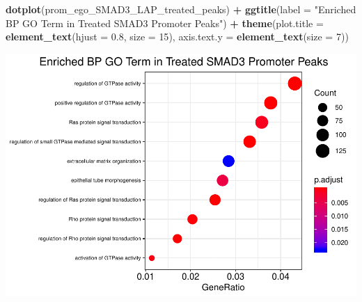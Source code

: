 \documentclass[]{article}
\newenvironment{Shaded}{\begin{snugshade}}{\end{snugshade}}
\newcommand{\DataTypeTok}[1]{\textcolor[rgb]{0.13,0.29,0.53}{#1}}
\newcommand{\DecValTok}[1]{\textcolor[rgb]{0.00,0.00,0.81}{#1}}
\newcommand{\FloatTok}[1]{\textcolor[rgb]{0.00,0.00,0.81}{#1}}
\newcommand{\KeywordTok}[1]{\textcolor[rgb]{0.13,0.29,0.53}{\textbf{#1}}}
\newcommand{\NormalTok}[1]{#1}
\newcommand{\OperatorTok}[1]{\textcolor[rgb]{0.81,0.36,0.00}{\textbf{#1}}}
\newcommand{\StringTok}[1]{\textcolor[rgb]{0.31,0.60,0.02}{#1}}
\begin{document}
\clearpage{}

\begin{Shaded}
\begin{Highlighting}[]
\KeywordTok{dotplot}\NormalTok{(prom_ego_SMAD3_LAP_treated_peaks) }\OperatorTok{+}\StringTok{ }\KeywordTok{ggtitle}\NormalTok{(}\DataTypeTok{label =} \StringTok{"Enriched BP GO Term in Treated SMAD3 Promoter Peaks"}\NormalTok{) }\OperatorTok{+}\StringTok{ }\KeywordTok{theme}\NormalTok{(}\DataTypeTok{plot.title =} \KeywordTok{element_text}\NormalTok{(}\DataTypeTok{hjust =} \FloatTok{0.8}\NormalTok{, }\DataTypeTok{size =} \DecValTok{15}\NormalTok{), }\DataTypeTok{axis.text.y =} \KeywordTok{element_text}\NormalTok{(}\DataTypeTok{size =} \DecValTok{7}\NormalTok{))}
\end{Highlighting}
\end{Shaded}

\includegraphics{peak_annotation_go_term_analysis_files/figure-latex/unnamed-chunk-31-1.pdf}
\end{document}
